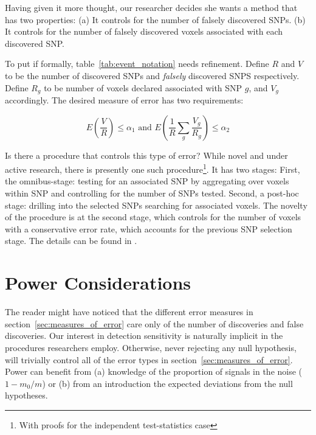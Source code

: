 \documentclass[review,12pt]{article}
\begin{document}
Having given it more thought, our researcher decides she wants a method that has two properties: 
(a) It controls for the number of falsely discovered SNPs. 
(b) It controls for the number of falsely discovered voxels associated with each discovered SNP. 

To put if formally, table~\ref{tab:event_notation} needs refinement. 
Define $R$ and $V$ to be the number of discovered SNPs and \emph{falsely} discovered SNPS respectively. 
Define $R_g$ to be number of voxels declared associated with SNP $g$, and $V_g$ accordingly. The desired measure of error has two requirements: 

\begin{equation} \label{eq:hirarchial_error}
 E \left(\frac{V}{R} \right)\leq \alpha_1 
\text{ and } 
E \left( \frac{1}{R}\sum_{g} \frac{V_{g}}{R_{g}} \right)\leq \alpha_2
\end{equation}


Is there a procedure that controls this type of error? While novel and under active research, there is presently one such procedure\footnote{With proofs for the independent test-statistics case}. It has two stages: 
First, the omnibus-stage:  testing for an associated SNP by aggregating over voxels within SNP and controlling for the number of SNPs tested. Second, a post-hoc stage: drilling into the selected SNPs searching for associated voxels. The novelty of the procedure is at the second stage, which controls for the number of voxels with a conservative error rate, which accounts for the previous SNP selection stage. 
The details can be found in \citet{benjamini_adjusting_2011}.




\section{\label{sec:power}Power Considerations}

The reader might have noticed that the different error measures in section~\ref{sec:measures_of_error} care only of the number of discoveries and false discoveries. Our interest in detection sensitivity is naturally implicit in the procedures researchers employ. Otherwise, never rejecting any null hypothesis, will trivially control all of the error types in section~\ref{sec:measures_of_error}. 
Power can benefit from (a) knowledge of the proportion of signals in the noise ($ 1 - m_0 / m $) or (b) from an introduction the expected deviations from the null hypotheses. 
\end{document}
